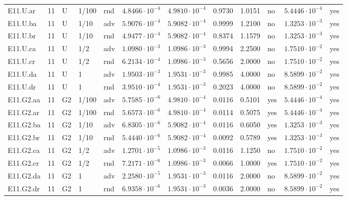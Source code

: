 {\begin{longtable}{@{}lllllllllll l@{}}
E11.U.ar & 11 & U & 1/100 & rnd & $4.8466\cdot 10^{-4}$ & $4.9810\cdot 10^{-4}$ & 0.9730 & 1.0151 & no & $5.4446\cdot 10^{-4}$ & yes \\
E11.U.ba & 11 & U & 1/10 & adv & $5.9076\cdot 10^{-4}$ & $5.9082\cdot 10^{-4}$ & 0.9999 & 1.2100 & no & $1.3253\cdot 10^{-3}$ & yes \\
E11.U.br & 11 & U & 1/10 & rnd & $4.9477\cdot 10^{-4}$ & $5.9082\cdot 10^{-4}$ & 0.8374 & 1.1579 & no & $1.3253\cdot 10^{-3}$ & yes \\
E11.U.ca & 11 & U & 1/2 & adv & $1.0980\cdot 10^{-3}$ & $1.0986\cdot 10^{-3}$ & 0.9994 & 2.2500 & no & $1.7510\cdot 10^{-2}$ & yes \\
E11.U.cr & 11 & U & 1/2 & rnd & $6.2134\cdot 10^{-4}$ & $1.0986\cdot 10^{-3}$ & 0.5656 & 2.0000 & no & $1.7510\cdot 10^{-2}$ & yes \\
E11.U.da & 11 & U & 1 & adv & $1.9503\cdot 10^{-3}$ & $1.9531\cdot 10^{-3}$ & 0.9985 & 4.0000 & no & $8.5899\cdot 10^{-2}$ & yes \\
E11.U.dr & 11 & U & 1 & rnd & $3.9510\cdot 10^{-4}$ & $1.9531\cdot 10^{-3}$ & 0.2023 & 4.0000 & no & $8.5899\cdot 10^{-2}$ & yes \\
E11.G2.aa & 11 & G2 & 1/100 & adv & $5.7585\cdot 10^{-6}$ & $4.9810\cdot 10^{-4}$ & 0.0116 & 0.5101 & yes & $5.4446\cdot 10^{-4}$ & yes \\
E11.G2.ar & 11 & G2 & 1/100 & rnd & $5.6573\cdot 10^{-6}$ & $4.9810\cdot 10^{-4}$ & 0.0114 & 0.5075 & yes & $5.4446\cdot 10^{-4}$ & yes \\
E11.G2.ba & 11 & G2 & 1/10 & adv & $6.8305\cdot 10^{-6}$ & $5.9082\cdot 10^{-4}$ & 0.0116 & 0.6050 & yes & $1.3253\cdot 10^{-3}$ & yes \\
E11.G2.br & 11 & G2 & 1/10 & rnd & $5.4440\cdot 10^{-6}$ & $5.9082\cdot 10^{-4}$ & 0.0092 & 0.5789 & yes & $1.3253\cdot 10^{-3}$ & yes \\
E11.G2.ca & 11 & G2 & 1/2 & adv & $1.2701\cdot 10^{-5}$ & $1.0986\cdot 10^{-3}$ & 0.0116 & 1.1250 & no & $1.7510\cdot 10^{-2}$ & yes \\
E11.G2.cr & 11 & G2 & 1/2 & rnd & $7.2171\cdot 10^{-6}$ & $1.0986\cdot 10^{-3}$ & 0.0066 & 1.0000 & yes & $1.7510\cdot 10^{-2}$ & yes \\
E11.G2.da & 11 & G2 & 1 & adv & $2.2580\cdot 10^{-5}$ & $1.9531\cdot 10^{-3}$ & 0.0116 & 2.0000 & no & $8.5899\cdot 10^{-2}$ & yes \\
E11.G2.dr & 11 & G2 & 1 & rnd & $6.9358\cdot 10^{-6}$ & $1.9531\cdot 10^{-3}$ & 0.0036 & 2.0000 & no & $8.5899\cdot 10^{-2}$ & yes \\

\end{longtable}}
